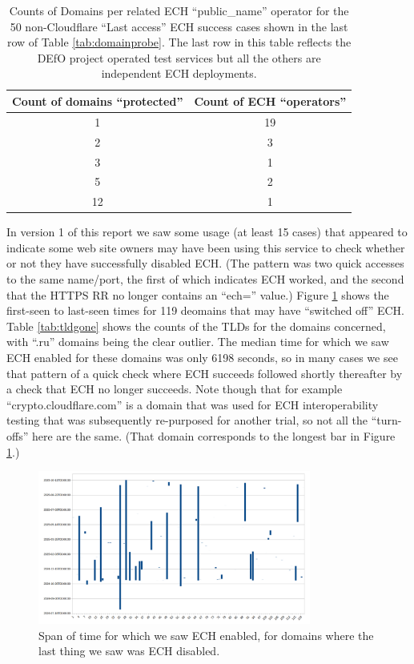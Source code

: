 \begin{table} 
	\centering
        \caption{Counts of Domains per related ECH ``public\_name'' operator for
                 the 50 non-Cloudflare ``Last access'' ECH success cases shown
                 in the last row of Table \ref{tab:domainprobe}. The last row
                 in this table reflects the DEfO project operated test services but
                 all the others are independent ECH deployments.}
		\begin{tabular} { | c | c | }
		\hline
            \hline Count of domains ``protected'' & Count of ECH ``operators'' \\
		\hline
            \hline 1 & 19 \\
            \hline 2 & 3 \\
            \hline 3 & 1 \\
            \hline 5 & 2 \\
            \hline 12 & 1 \\
		\hline
		\end{tabular}
	\label{tab:notcf}
\end{table}

In version 1 of this report we saw some usage (at least 15 cases) that
appeared to indicate some web site owners may have been using this service to check
whether or not they have successfully disabled ECH. (The pattern was two quick
accesses to the same name/port, the first of which indicates ECH worked, and
the second that the HTTPS RR no longer contains an ``ech='' value.)
Figure \ref{fig:onoff} shows the first-seen to last-seen times for 119
deomains that may have ``switched off'' ECH. Table \ref{tab:tldgone} shows the
counts of the TLDs for the domains concerned, with ``.ru'' domains being
the clear outlier. The median time for which we saw ECH enabled for these
domains was only 6198 seconds, so in many cases we see that pattern of a
quick check where ECH succeeds followed shortly thereafter by a check
that ECH no longer succeeds. Note though that for example ``crypto.cloudflare.com''
is a domain that was used for ECH interoperability testing that was subsequently 
re-purposed for another trial, so not all the ``turn-offs'' here are
the same. (That domain corresponds to the longest bar in Figure \ref{fig:onoff}.)

\begin{figure}
	\centering
	\includegraphics[width=0.8\textwidth,keepaspectratio]{turnofftimes.png}
        \caption[clustediag]{Span of time for which we saw ECH enabled, for
        domains where the last thing we saw was ECH disabled.}
	\label{fig:onoff}
\end{figure}

